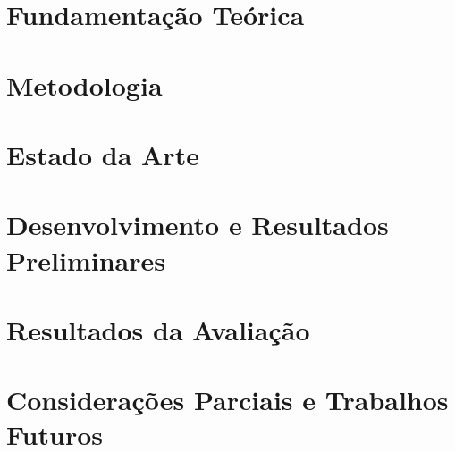 \documentclass[
    12pt,
    oneside,
    a4paper,
    english,
    brazil,
    sumario=tradicional,
    msc
]{dcomp-abntex2}
\begin{document}
\chapter{Fundamentação Teórica}


\chapter{Metodologia}
\label{cap:metodologia}


\chapter{Estado da Arte}
\label{cap:estado_arte}


\chapter{Desenvolvimento e Resultados Preliminares} %
\label{cap:desenvolvimento}


\chapter{Resultados da Avaliação}
\label{cap:resultados}


\chapter{Considerações Parciais e Trabalhos Futuros}




\end{document}
